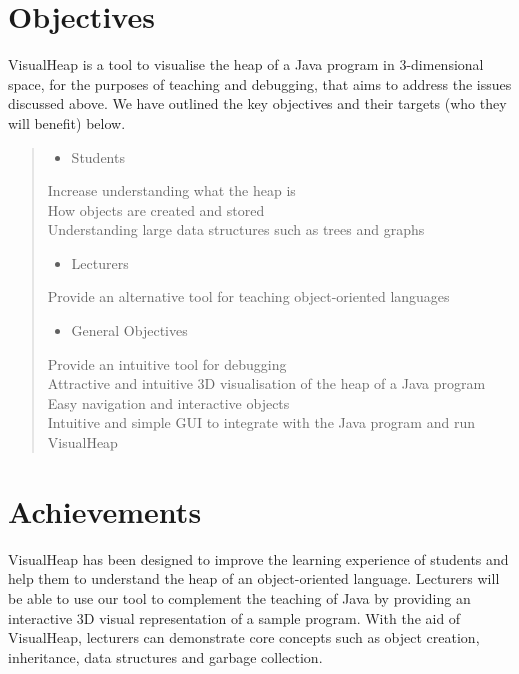 \documentclass[11pt, a4paper]{report}
\begin{document}
\section{Objectives}

VisualHeap is a tool to visualise the heap of a Java program in 3-dimensional space, for the purposes of teaching and debugging, that aims to address the issues discussed above. We have  outlined the key objectives and their targets (who they will benefit) below.

\begin{quote}

\begin{itemize}
  \item Students
\end{itemize}
Increase understanding what the heap is \\
How objects are created and stored \\
Understanding large data structures such as trees and graphs

\begin{itemize}
  \item Lecturers
\end{itemize}
Provide an alternative tool for teaching object-oriented languages

\begin{itemize}
  \item General Objectives
\end{itemize}
Provide an intuitive tool for debugging \\
Attractive and intuitive 3D visualisation of the heap of a Java program \\
Easy navigation and interactive objects \\
Intuitive and simple GUI to integrate with the Java program and run VisualHeap

\end{quote}

\section{Achievements}

VisualHeap has been designed to improve the learning experience of students and help them to understand the heap of an object-oriented language. Lecturers will be able to use our tool to complement the teaching of Java by providing an interactive 3D visual representation of a sample program. With the aid of VisualHeap, lecturers can demonstrate core concepts such as object creation, inheritance, data structures and garbage collection. 
\end{document}
